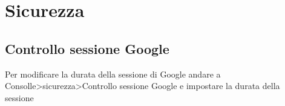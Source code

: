 \chapter{Sicurezza}
\section{Controllo sessione Google}
Per modificare la durata della sessione di Google andare a 
Consolle>sicurezza>Controllo sessione Google e impostare la durata della sessione